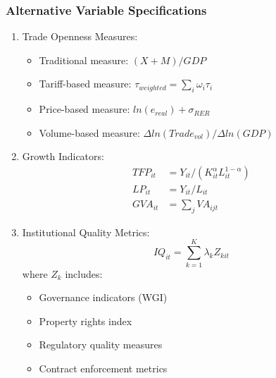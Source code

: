 \documentclass[12pt,a4paper]{article}
\theoremstyle{definition}
\begin{document}
\subsubsection{Alternative Variable Specifications}
\begin{enumerate}
    \item Trade Openness Measures:
    \begin{itemize}
        \item Traditional measure: $(X + M)/GDP$
        \item Tariff-based measure: $\tau_{weighted} = \sum_i \omega_i \tau_i$
        \item Price-based measure: $ln(e_{real}) + \sigma_{RER}$
        \item Volume-based measure: $\Delta ln(Trade_{vol})/\Delta ln(GDP)$
    \end{itemize}

    \item Growth Indicators:
    \begin{equation}
    \begin{split}
    TFP_{it} &= Y_{it}/(K_{it}^\alpha L_{it}^{1-\alpha}) \\
    LP_{it} &= Y_{it}/L_{it} \\
    GVA_{it} &= \sum_j VA_{ijt}
    \end{split}
    \end{equation}

    \item Institutional Quality Metrics:
    \begin{equation}
    IQ_{it} = \sum_{k=1}^K \lambda_k Z_{kit}
    \end{equation}
    where $Z_k$ includes:
    \begin{itemize}
        \item Governance indicators (WGI)
        \item Property rights index
        \item Regulatory quality measures
        \item Contract enforcement metrics
    \end{itemize}
\end{enumerate}
\end{document}
